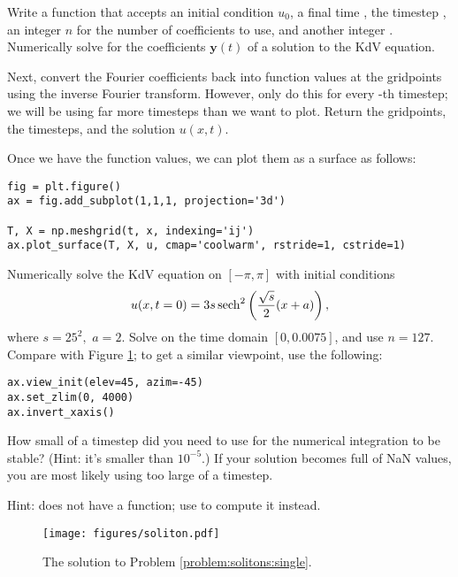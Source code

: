 \begin{problem}
Write a function that accepts an initial condition \(u_0\), a final time , the timestep , an integer \(n\) for the number of coefficients to use, and another integer .
Numerically solve for the coefficients \(\mathbf{y}(t)\) of a solution to the KdV equation.

Next, convert the Fourier coefficients back into function values at the gridpoints using the inverse Fourier transform.
However, only do this for every -th timestep; we will be using far more timesteps than we want to plot.
Return the gridpoints, the timesteps, and the solution \(u(x,t)\).
\end{problem}

\noindent
Once we have the function values, we can plot them as a surface as follows:
\begin{lstlisting}
fig = plt.figure()
ax = fig.add_subplot(1,1,1, projection='3d')

T, X = np.meshgrid(t, x, indexing='ij')
ax.plot_surface(T, X, u, cmap='coolwarm', rstride=1, cstride=1)
\end{lstlisting}

\begin{problem}
Numerically solve the KdV equation on $[-\pi,\pi]$ with initial conditions 
\[
u(x,t=0) = 3s\operatorname{sech}^2\left(\frac{\sqrt{s}}{2}(x+a)\right),
\]
where $s = 25^2,$ $a = 2$. Solve on the time domain $[0,0.0075]$, and use \(n=127\).
Compare with Figure \ref{fig:solitons:single}; to get a similar viewpoint, use the following:
\begin{lstlisting}
ax.view_init(elev=45, azim=-45)
ax.set_zlim(0, 4000)
ax.invert_xaxis()
\end{lstlisting} %
How small of a timestep did you need to use for the numerical integration to be stable?
(Hint: it's smaller than $10^{-5}$.)
If your solution becomes full of NaN values, you are most likely using too large of a timestep.
\label{problem:solitons:single}

\noindent
Hint:  does not have a  function; use  to compute it instead.
\end{problem}

\begin{figure}[H]
\centering
\texttt{[image: figures/soliton.pdf]}
\caption{The solution to Problem \ref{problem:solitons:single}.}
\label{fig:solitons:single}
\end{figure}

